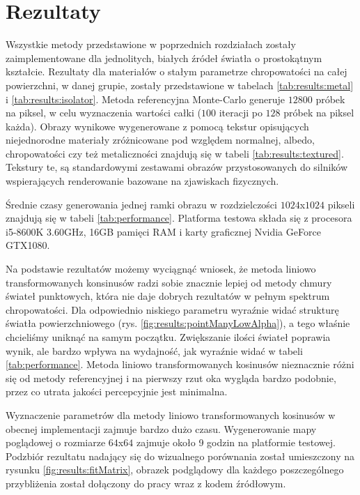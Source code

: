 \documentclass[../main.tex]{subfiles}
\begin{document}
\chapter{Rezultaty}

Wszystkie metody przedstawione w poprzednich rozdziałach zostały zaimplementowane dla jednolitych, białych źródeł światła o prostokątnym kształcie. Rezultaty dla materiałów o stałym parametrze chropowatości na całej powierzchni, w danej grupie, zostały przedstawione w tabelach \ref{tab:results:metal} i \ref{tab:results:isolator}. Metoda referencyjna Monte-Carlo generuje $12 800$ próbek na piksel, w celu wyznaczenia wartości całki ($100$ iteracji po $128$ próbek na piksel każda). Obrazy wynikowe wygenerowane z pomocą tekstur opisujących niejednorodne materiały zróżnicowane pod względem normalnej, albedo, chropowatości czy też metaliczności znajdują się w tabeli \ref{tab:results:textured}. Tekstury te, są standardowymi zestawami obrazów przystosowanych do silników wspierających renderowanie bazowane na zjawiskach fizycznych.

Średnie czasy generowania jednej ramki obrazu w rozdzielczości $1024$x$1024$ pikseli znajdują się w tabeli \ref{tab:performance}. Platforma testowa składa się z procesora i5-8600K 3.60GHz, 16GB pamięci RAM i karty graficznej Nvidia GeForce GTX1080.

Na podstawie rezultatów możemy wyciągnąć wniosek, że metoda liniowo transformowanych konsinusów radzi sobie znacznie lepiej od metody chmury świateł punktowych, która nie daje dobrych rezultatów w pełnym spektrum chropowatości. Dla odpowiednio niskiego parametru wyraźnie widać strukturę światła powierzchniowego (rys. \ref{fig:results:pointManyLowAlpha}), a tego właśnie chcieliśmy uniknąć na samym początku. Zwiększanie ilości świateł poprawia wynik, ale bardzo wpływa na wydajność, jak wyraźnie widać w tabeli \ref{tab:performance}. Metoda liniowo transformowanych kosinusów nieznacznie różni się od metody referencyjnej i na pierwszy rzut oka wygląda bardzo podobnie, przez co utrata jakości percepcyjnie jest minimalna.

Wyznaczenie parametrów dla metody liniowo transformowanych kosinusów w obecnej implementacji zajmuje bardzo dużo czasu. Wygenerowanie mapy poglądowej o rozmiarze $64$x$64$ zajmuje około 9 godzin na platformie testowej. Podzbiór rezultatu nadający się do wizualnego porównania został umieszczony na rysunku \ref{fig:results:fitMatrix}, obrazek podglądowy dla każdego poszczególnego przybliżenia został dołączony do pracy wraz z kodem źródłowym.
\end{document}
